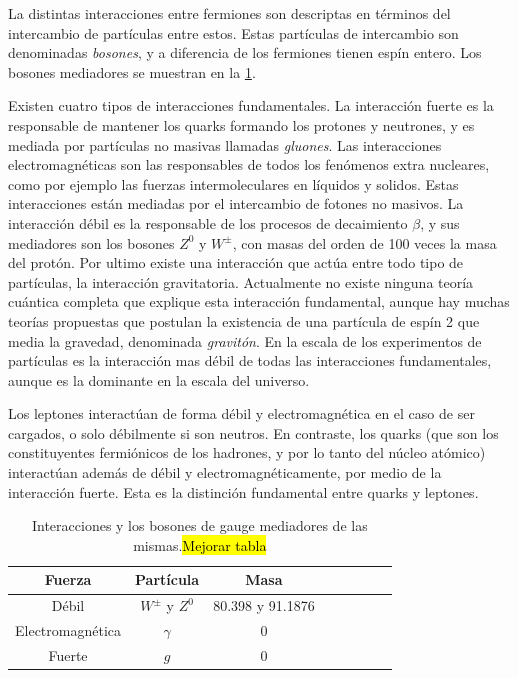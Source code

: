 La distintas interacciones entre fermiones son descriptas en términos del
intercambio de partículas entre estos. Estas partículas de intercambio son
denominadas \emph{bosones}, y a diferencia de los fermiones tienen espín entero.
Los bosones mediadores se muestran en la \cref{tab:bosons}.

Existen cuatro tipos de interacciones fundamentales. La interacción fuerte es la
responsable de mantener los quarks formando los protones y neutrones, y es
mediada por partículas no masivas llamadas \emph{gluones}. Las interacciones
electromagnéticas son las responsables de todos los fenómenos extra nucleares,
como por ejemplo las fuerzas intermoleculares en líquidos y solidos. Estas
interacciones están mediadas por el intercambio de fotones no masivos. La
interacci\'on débil es la responsable de los procesos de decaimiento $\beta$, y
sus mediadores son los bosones $Z^0$ y $W^\pm$, con masas del orden de 100 veces
la masa del protón. Por ultimo existe una interacción que actúa entre todo tipo
de partículas, la interacción gravitatoria. Actualmente no existe ninguna teoría
cuántica completa que explique esta interacción fundamental, aunque hay muchas
teorías propuestas que postulan la existencia de una partícula de espín 2 que
media la gravedad, denominada \emph{gravitón}. En la escala de los experimentos
de partículas es la interacción mas débil de todas las interacciones
fundamentales, aunque es la dominante en la escala del universo.

Los leptones interactúan de forma débil y electromagnética en el caso de ser
cargados, o solo débilmente si son neutros. En contraste, los quarks (que son
los constituyentes fermiónicos de los hadrones, y por lo tanto del núcleo
atómico) interactúan además de débil y electromagnéticamente, por medio de la
interacción fuerte. Esta es la distinción fundamental entre quarks y leptones.


\begin{table}[!ht]
  \centering
  \begin{tabular}{cccccccc}
    \hline
    Fuerza & Partícula & Masa \\
    \hline
    Débil    &   $W^\pm$ y $Z^0$ & 80.398 y 91.1876  \\ %
    \hline
    Electromagnética & $\gamma$ & 0 \\
    \hline
    Fuerte & $g$ & 0\\
    \hline
  \end{tabular}


  \caption{Interacciones y los bosones de gauge mediadores de las mismas.\hl{Mejorar tabla}}
  \label{tab:bosons}
\end{table}


